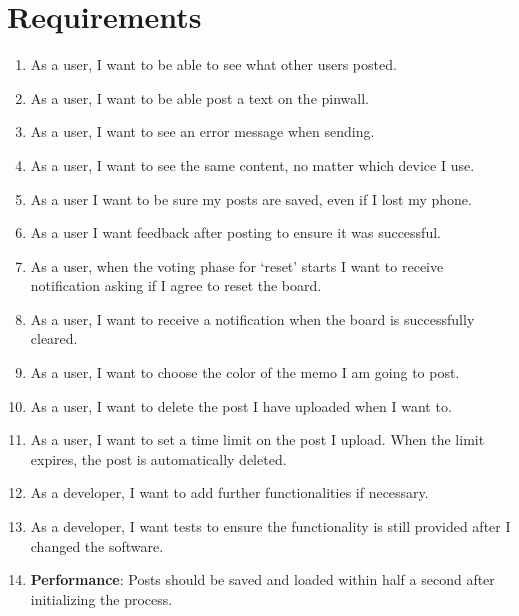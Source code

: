 \documentclass[conference]{IEEEtran}
\numberwithin{figure}{subsection}
\begin{document}
\section{Requirements}
\begin{enumerate}
 \item As a user, I want to be able to see what other users posted.\\
 \item As a user, I want to be able post a text on the pinwall.\\
 \item As a user, I want to see an error message when sending.\\
 \item As a user, I want to see the same content, no matter which device I use.\\
 \item As a user I want to be sure my posts are saved, even if I lost my phone.\\
 \item As a user I want feedback after posting to ensure it was successful.\\
 \item As a user, when the voting phase for ‘reset’ starts I want to receive notification asking if I agree to reset the board. \\
 \item As a user, I want to receive a notification when the board is successfully cleared.\\
 \item As a user, I want to choose the color of the memo I am going to post.\\
 \item As a user, I want to delete the post I have uploaded when I want to. \\
 \item As a user, I want to set a time limit on the post I upload. When the limit expires, the post is automatically deleted.\\
 \item As a developer, I want to add further functionalities if necessary.\\
 \item As a developer, I want tests to ensure the functionality is still provided after I changed the software.\\
 \item \textbf{Performance}: Posts should be saved and loaded within half a second after initializing the process.\\


\end{enumerate}
\end{document}
